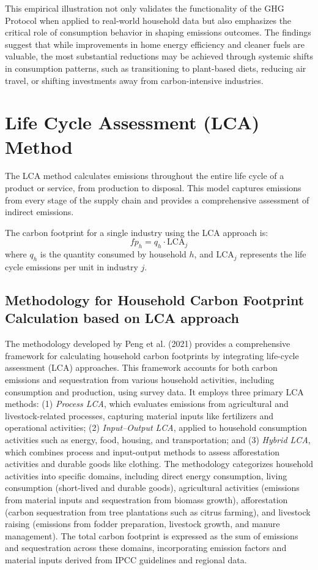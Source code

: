 \documentclass[12pt,a4paper]{article}%
\begin{document}
This empirical illustration not only validates the functionality of the GHG Protocol when applied to real-world household data but also emphasizes the critical role of consumption behavior in shaping emissions outcomes. The findings suggest that while improvements in home energy efficiency and cleaner fuels are valuable, the most substantial reductions may be achieved through systemic shifts in consumption patterns, such as transitioning to plant-based diets, reducing air travel, or shifting investments away from carbon-intensive industries.
\section{Life Cycle Assessment (LCA) Method}
The LCA method calculates emissions throughout the entire life cycle of a product or service, from production to disposal. This model captures emissions from every stage of the supply chain and provides a comprehensive assessment of indirect emissions.

The carbon footprint for a single industry using the LCA approach is:
\[
fp_h = q_h \cdot \text{LCA}_j
\]
where \(q_h\) is the quantity consumed by household \(h\), and \(\text{LCA}_j\) represents the life cycle emissions per unit in industry \(j\).


\subsection{Methodology for Household Carbon Footprint Calculation based on LCA approach}

The methodology developed by Peng et al. (2021) provides a comprehensive framework for calculating household carbon footprints by integrating life-cycle assessment (LCA) approaches. This framework accounts for both carbon emissions and sequestration from various household activities, including consumption and production, using survey data. It employs three primary LCA methods: (1) \textit{Process LCA}, which evaluates emissions from agricultural and livestock-related processes, capturing material inputs like fertilizers and operational activities; (2) \textit{Input–Output LCA}, applied to household consumption activities such as energy, food, housing, and transportation; and (3) \textit{Hybrid LCA}, which combines process and input-output methods to assess afforestation activities and durable goods like clothing. The methodology categorizes household activities into specific domains, including direct energy consumption, living consumption (short-lived and durable goods), agricultural activities (emissions from material inputs and sequestration from biomass growth), afforestation (carbon sequestration from tree plantations such as citrus farming), and livestock raising (emissions from fodder preparation, livestock growth, and manure management). The total carbon footprint is expressed as the sum of emissions and sequestration across these domains, incorporating emission factors and material inputs derived from IPCC guidelines and regional data. 
\end{document}
